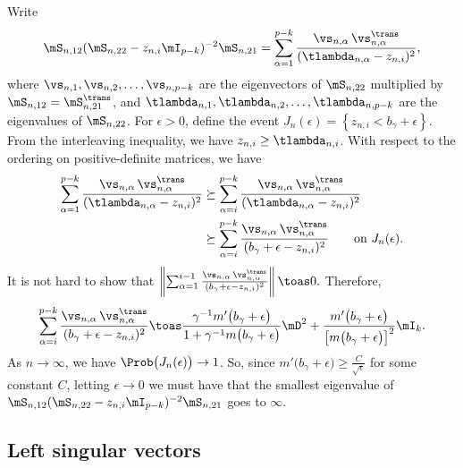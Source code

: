 Write
\[
    \mS_{n,12}
    ( \mS_{n,22} - z_{n,i} \mI_{p-k} )^{-2} 
    \mS_{n,21}
        =
        \sum_{\alpha=1}^{p-k}
            \frac{ \vs_{n,\alpha} \, \vs_{n,\alpha}^\trans }
                 { ( \tlambda_{n,\alpha} - z_{n,i} )^2 },
\]
where $\vs_{n,1}, \vs_{n,2}, \ldots, \vs_{n,p-k}$ are the 
eigenvectors of $\mS_{n,22}$ multiplied by $\mS_{n,12} = \mS_{n,21}^\trans$, and
$\tlambda_{n,1}, \tlambda_{n,2}, \ldots, \tlambda_{n,p-k}$ are the eigenvalues
of $\mS_{n,22}$.  For $\epsilon > 0$, define the event 
\(
    J_{n}(\epsilon)
    =
    \left\{
        z_{n,i} < b_\gamma + \epsilon
    \right\}.
\)
From the interleaving inequality, we have $z_{n,i} \geq \tlambda_{n,i}$.
With respect to the ordering on positive-definite matrices, we have
\begin{align*}
    \sum_{\alpha=1}^{p-k}
            \frac{ \vs_{n,\alpha} \, \vs_{n,\alpha}^\trans }
                 { ( \tlambda_{n,\alpha} - z_{n,i} )^2 }
        &\succeq
            \sum_{\alpha=i}^{p-k}
                    \frac{ \vs_{n,\alpha} \, \vs_{n,\alpha}^\trans }
                         { ( \tlambda_{n,\alpha} - z_{n,i} )^2 } \\
        &\succeq
            \sum_{\alpha=i}^{p-k}
                    \frac{ \vs_{n,\alpha} \, \vs_{n,\alpha}^\trans }
                         { ( b_\gamma + \epsilon - z_{n,i} )^2 }
            \qquad\text{on $J_n(\epsilon)$.}
\end{align*}
It is not hard to show that
\(
    \left\|
        \sum_{\alpha=1}^{i-1}
                \frac{ \vs_{n,\alpha} \, \vs_{n,\alpha}^\trans }
                     { ( b_\gamma + \epsilon - z_{n,i} )^2 }
    \right\|
        \toas 0.
\)
Therefore,
\[
    \sum_{\alpha=i}^{p-k}
            \frac{ \vs_{n,\alpha} \, \vs_{n,\alpha}^\trans }
                 { ( b_\gamma + \epsilon - z_{n,i} )^2 }
        \toas
        \frac{ \gamma^{-1} m'\big( b_\gamma + \epsilon \big) }
             { 1 + \gamma^{-1} m\big( b_\gamma + \epsilon \big)}
        \mD^2
        +
        \frac{ m'\big( b_\gamma + \epsilon \big) }
             { \left[ m\big( b_\gamma + \epsilon \big) \right]^2}
        \mI_k.
\]
As $n\to\infty$, we have $\Prob\big( J_n(\epsilon) \big) \to 1$.  So,
since $m'\big( b_\gamma + \epsilon \big) \geq \frac{C}{\sqrt{\epsilon}}$
for some constant $C$, 
letting $\epsilon \to 0$ we must have that the smallest eigenvalue of
\(
    \mS_{n,12}
    ( \mS_{n,22} - z_{n,i} \mI_{p-k} )^{-2} 
    \mS_{n,21}
\)
goes to $\infty$.

\subsection{Left singular vectors}


